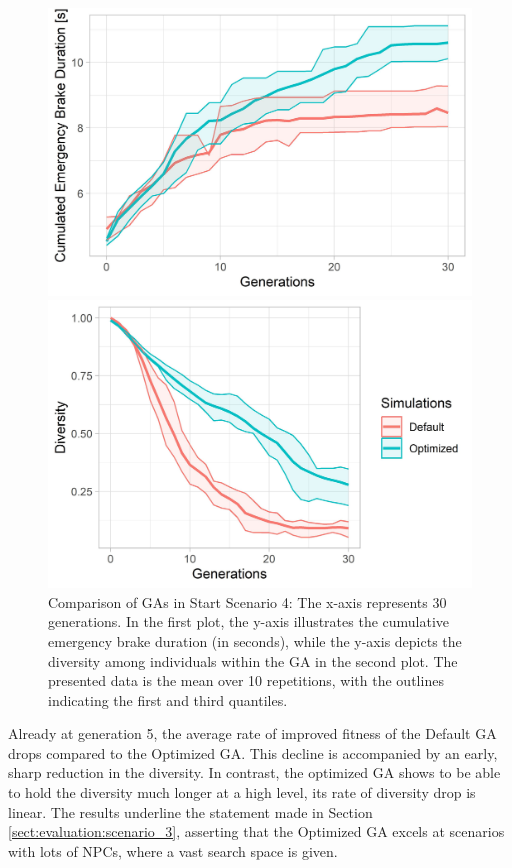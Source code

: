 \begin{figure}[ht] 
	\begin{minipage}[b]{0.5\linewidth}
		\centering
		\includegraphics[width=1\linewidth]{simulations/evaluation/plots/sim_4_ga_generations} 
	\end{minipage}%
	\begin{minipage}[b]{0.5\linewidth}
		\centering
		\includegraphics[width=1\linewidth]{simulations/evaluation/plots/sim_4_ga_diversity} 
	\end{minipage} 
	\caption{Comparison of GAs in Start Scenario 4: The x-axis represents 30 generations. In the first plot, the y-axis illustrates the cumulative emergency brake duration (in seconds), while the y-axis depicts the diversity among individuals within the GA in the second plot. The presented data is the mean over 10 repetitions, with the outlines indicating the first and third quantiles.}
	\label{fig:evaluation:sim_4_ga_comparison}
\end{figure}

Already at generation 5, the average rate of improved fitness of the Default GA drops compared to the Optimized GA. This decline is accompanied by an early, sharp reduction in the diversity. In contrast, the optimized GA shows to be able to hold the diversity much longer at a high level, its rate of diversity drop is linear. The results underline the statement made in Section \ref{sect:evaluation:scenario_3}, asserting that the Optimized GA excels at scenarios with lots of NPCs, where a vast search space is given.



